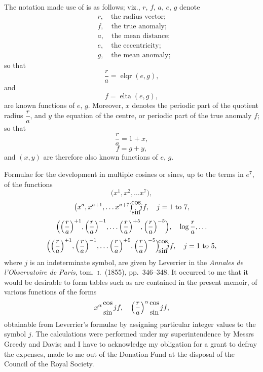 \documentclass[12pt,a4paper]{article}
\providecommand{\elqr}{\mathop{\mathrm{elqr}}}
\providecommand{\elta}{\mathop{\mathrm{elta}}}
\theoremstyle{plain}
\begin{document}
\medskip
The notation made use of is as follows; viz., $r$, $f$, $a$, $e$, $g$ denote
\begin{align*}
&r,\quad \text{the radius vector};\\
&f,\quad \text{the true anomaly};\\
&a,\quad \text{the mean distance};\\
&e,\quad \text{the eccentricity};\\
&g,\quad \text{the mean anomaly};
\end{align*}
so that
\[
\dfrac{r}{a}=\elqr(e,g),
\]
and
\[
f=\elta(e,g),
\]
are known functions of $e$, $g$. Moreover, $x$ denotes the periodic part of the quotient radius $\dfrac{r}{a}$, and $y$ the equation of the centre, or periodic part of the true anomaly $f$; so that
\[
\dfrac{r}{a}=1+x,
\]
\[
f=g+y,
\]
and $(x,y)$ are therefore also known functions of $e$, $g$.

\newpage
{} Formulae for the development in multiple cosines or sines, up to the terms in $e^{7}$, of the functions
\[
\bigl(x^{1},x^{2},\ldots x^{7}\bigr),
\]
\[
\bigl(x^{a},x^{a+1},\ldots x^{a+7}\bigr)\!\!{\cos\atop\sin}\!\!jf,\quad j=1\ \text{to}\ 7,
\]
\[
\Bigl(\Bigl(\dfrac{r}{a}\Bigr)^{+1},\Bigl(\dfrac{r}{a}\Bigr)^{-1},\ldots\Bigl(\dfrac{r}{a}\Bigr)^{+5},\Bigl(\dfrac{r}{a}\Bigr)^{-5}\Bigr),\quad \log\dfrac{r}{a},\ldots
\]
\[
\Bigl(\Bigl(\dfrac{r}{a}\Bigr)^{+1},\Bigl(\dfrac{r}{a}\Bigr)^{-1},\ldots\Bigl(\dfrac{r}{a}\Bigr)^{+5},\Bigl(\dfrac{r}{a}\Bigr)^{-5}\Bigr)\!\!{\cos\atop\sin}\!\!jf,\quad j=1\ \text{to}\ 5,
\]
where $j$ is an indeterminate symbol, are given by Leverrier in the \textit{Annales de l'Observatoire de Paris}, tom.\ \textsc{i}.\ (1855), pp.~346--348. It occurred to me that it would be desirable to form tables such as are contained in the present memoir, of various functions of the forms
\[
x^{\alpha}{\cos\atop\sin}jf,\quad \Bigl(\dfrac{r}{a}\Bigr)^{\alpha}{\cos\atop\sin}jf,
\]
obtainable from Leverrier's formulae by assigning particular integer values to the symbol $j$. The calculations were performed under my superintendence by Messrs Greedy and Davis; and I have to acknowledge my obligation for a grant to defray the expenses, made to me out of the Donation Fund at the disposal of the Council of the Royal Society.
\end{document}
